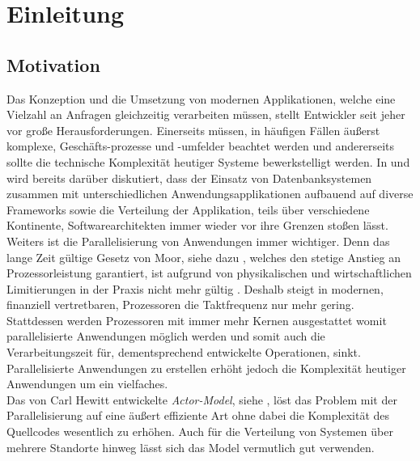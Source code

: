 \chapter{Einleitung}\label{cha:introduction}
\section{Motivation}\label{sec:introduction:motivation}
Das Konzeption und die Umsetzung von modernen Applikationen, welche eine Vielzahl an Anfragen gleichzeitig verarbeiten müssen, stellt Entwickler seit jeher vor große Herausforderungen. Einerseits müssen, in häufigen Fällen äußerst komplexe, Geschäfts-prozesse und -umfelder beachtet werden und andererseits sollte die technische Komplexität heutiger Systeme bewerkstelligt werden. In \cite{Vernon2015ReactiveAkka} und \cite{Evans2004Domain-drivenSoftware} wird bereits darüber diskutiert, dass der Einsatz von Datenbanksystemen zusammen mit unterschiedlichen Anwendungsapplikationen aufbauend auf diverse Frameworks  sowie die Verteilung der Applikation, teils über verschiedene Kontinente,  Softwarearchitekten immer wieder vor ihre Grenzen stoßen lässt. \\
Weiters ist die Parallelisierung von Anwendungen immer wichtiger. Denn das lange Zeit gültige Gesetz von Moor, siehe dazu \cite{moore1965moore}, welches den stetige Anstieg an Prozessorleistung garantiert, ist aufgrund von physikalischen und wirtschaftlichen Limitierungen in der Praxis nicht mehr gültig \citep{mann2000end}. Deshalb steigt in modernen, finanziell vertretbaren, Prozessoren die Taktfrequenz nur mehr gering. Stattdessen werden Prozessoren mit immer mehr Kernen ausgestattet womit parallelisierte Anwendungen möglich werden und somit auch die Verarbeitungszeit für, dementsprechend entwickelte Operationen, sinkt. Parallelisierte Anwendungen zu erstellen erhöht jedoch die Komplexität heutiger Anwendungen um ein vielfaches. \\
Das von Carl Hewitt entwickelte \textit{Actor-Model}, siehe \cite{Hewitt1973AIntelligence}, löst das Problem mit der Parallelisierung auf eine äußert effiziente Art ohne dabei die Komplexität des Quellcodes wesentlich zu erhöhen. Auch für die Verteilung von Systemen über mehrere Standorte hinweg lässt sich das Model vermutlich gut verwenden. \\
% 
